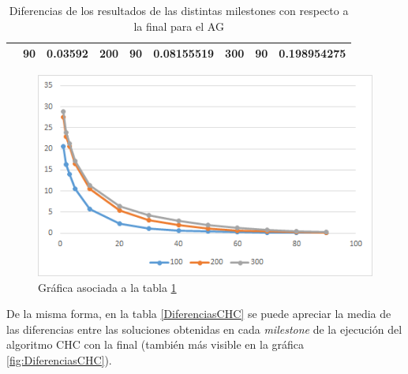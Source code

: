 \begin{table}[]
\begin{tabular}{|cclcclccl|}
\rowcolor[HTML]{DAE8FC} 
\multicolumn{1}{|c|}{\multirow{-13}{*}{\cellcolor[HTML]{FFFFC7}\textbf{100}}} & \multicolumn{1}{c|}{\cellcolor[HTML]{DAE8FC}90}        & \multicolumn{1}{l|}{\cellcolor[HTML]{DAE8FC}0.03592}    & \multicolumn{1}{c|}{\multirow{-13}{*}{\cellcolor[HTML]{FFFFC7}\textbf{200}}} & \multicolumn{1}{c|}{\cellcolor[HTML]{DAE8FC}90}        & \multicolumn{1}{l|}{\cellcolor[HTML]{DAE8FC}0.08155519} & \multicolumn{1}{c|}{\multirow{-13}{*}{\cellcolor[HTML]{FFFFC7}\textbf{300}}} & \multicolumn{1}{c|}{\cellcolor[HTML]{DAE8FC}90}        & 0.198954275 \\ \hline
\end{tabular}
\caption{\label{diferenciasAGEU}Diferencias de los resultados de las distintas milestones con respecto a la final para el AG}
\end{table}

\begin{figure}
		\centering
		\includegraphics[scale=1]{imagenes/Experimental/DiferenciasAGEU.png}
        \caption{Gráfica asociada a la tabla \ref{diferenciasAGEU}}
        \label{fig:DiferenciasAGEU}
\end{figure}

De la misma forma, en la tabla \ref{DiferenciasCHC} se puede apreciar la media de las diferencias entre las soluciones obtenidas en cada \textit{milestone} de la ejecución del algoritmo CHC con la final (también más visible en la gráfica \ref{fig:DiferenciasCHC}). 

